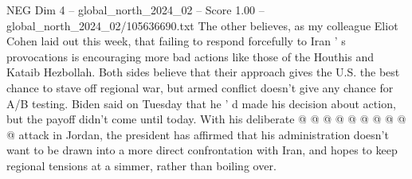 \begin{textsample}{NEG Dim 4 – global\_north\_2024\_02 – Score 1.00 – global\_north\_2024\_02/105636690.txt}
The other believes, as my colleague Eliot Cohen laid out this week, that failing to respond forcefully to Iran ' s provocations is encouraging more bad actions like those of the Houthis and Kataib Hezbollah.
Both sides believe that their approach gives the U.S. the best chance to stave off regional war, but armed conflict doesn't give any chance for A/B testing.
Biden said on Tuesday that he ' d made his decision about action, but the payoff didn't come until today.
With his deliberate @ @ @ @ @ @ @ @ @ @ attack in Jordan, the president has affirmed that his administration doesn't want to be drawn into a more direct confrontation with Iran, and hopes to keep regional tensions at a simmer, rather than boiling over.

\end{textsample}
